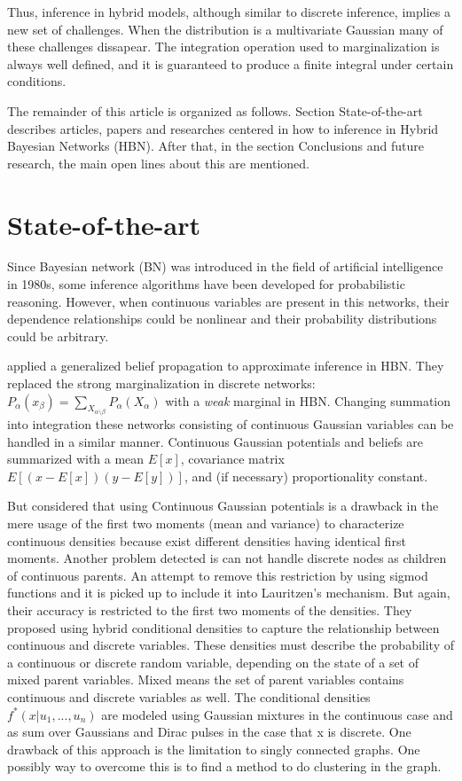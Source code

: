 \documentclass[a4paper,11pt]{article}
\begin{document}
Thus, inference in hybrid models, although similar to discrete inference, implies a new set of challenges. When the distribution is a multivariate Gaussian many of these challenges dissapear. The integration operation used to marginalization is always well defined, and it is guaranteed to produce a finite integral under certain conditions.

The remainder of this article is organized as follows. Section State-of-the-art describes articles, papers and  researches centered in how to inference in Hybrid Bayesian Networks (HBN). After that, in the section Conclusions and future research, the main open lines about this are mentioned.

\section{State-of-the-art}

Since Bayesian network (BN) was introduced in the field of artificial intelligence in 1980s, some inference algorithms have been developed for probabilistic reasoning. However, when continuous variables are present in this networks, their dependence relationships could be nonlinear and their probability distributions could be arbitrary. 

\cite{heskeszoeter2003} applied a generalized belief propagation to approximate inference in HBN. They replaced the strong marginalization in discrete networks: 
$ P_{\alpha}(x_{\beta}) = \sum_{X_{\alpha\setminus\beta}}P_{\alpha}(X_{\alpha}) $ with a \textit{weak} marginal in HBN. Changing summation into integration these networks consisting of continuous Gaussian variables can be handled in a similar manner. Continuous Gaussian potentials and beliefs are summarized with a mean $E[x]$, covariance matrix $ E[(x-E[x])(y-E[y])] $, and (if necessary) proportionality constant.

But \cite{schrempfhanebeck2004} considered that  using  Continuous Gaussian potentials is a drawback in the mere usage of the first two moments (mean and variance) to characterize continuous densities because exist different densities having identical first moments. Another problem detected is can not handle discrete nodes as children of continuous parents. An attempt to remove this restriction by using sigmod functions and it is picked up to include it into Lauritzen’s mechanism. But again, their accuracy is restricted to the first two moments of the densities.
 They proposed using hybrid conditional densities to capture the relationship between continuous and discrete variables. These densities must describe the probability of a continuous or discrete random variable, depending on the state of a set of mixed parent variables. Mixed means the set of parent variables contains continuous and discrete variables as well. The conditional densities $ f^{*}(x|u_1,...,u_n)$ are modeled using Gaussian mixtures in the continuous case and as sum over Gaussians and Dirac pulses in the case that x is discrete. One drawback of this approach is the limitation to singly connected graphs. One possibly way to overcome this is to find a method to do clustering in the graph.
\end{document}
